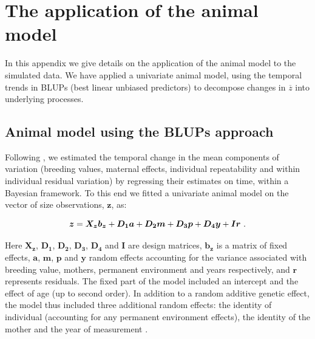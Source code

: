 \section{The application of the animal model} \label{app:am}
In this appendix we give details on the application of the animal model to the simulated data. We have applied a univariate animal model, using the temporal trends in BLUPs (best linear unbiased predictors) to decompose changes in $\overline z$ into underlying processes.

\subsection{Animal model using the BLUPs approach} \label{app:am:blup}
Following \cite{Hadfield2010b}, we estimated the temporal change in the mean components of variation (breeding values, maternal effects, individual repeatability and within individual residual variation) by regressing their estimates on time, within a Bayesian framework. 
To this end we fitted a univariate animal model on the vector of size observations, $\boldsymbol{z}$, as:

\begin{equation}
\boldsymbol{z}=\boldsymbol{X_z}\boldsymbol{b_z}+\boldsymbol{D_1a}+\boldsymbol{D_2m}+\boldsymbol{D_3p}+\boldsymbol{D_4y}+\boldsymbol{Ir} \text{ .}\\
\end{equation}

\noindent Here $\boldsymbol{X_z}$, $\boldsymbol{D_1}$, $\boldsymbol{D_2}$, $\boldsymbol{D_3}$, $\boldsymbol{D_4}$ and $\boldsymbol{I}$ are design matrices, $\boldsymbol{b_z}$ is a matrix of fixed effects, $\boldsymbol{a}$, $\boldsymbol{m}$, $\boldsymbol{p}$ and $\boldsymbol{y}$ random effects accounting for the variance associated with breeding value, mothers, permanent environment and years respectively, and $\boldsymbol{r}$ represents residuals. The fixed part of the model included an intercept and the effect of age (up to second order). In addition to a random additive genetic effect, the model thus included three additional random effects: the identity of individual (accounting for any permanent environment effects), the identity of the mother and the year of measurement \parencite{Kruuk2004}.

